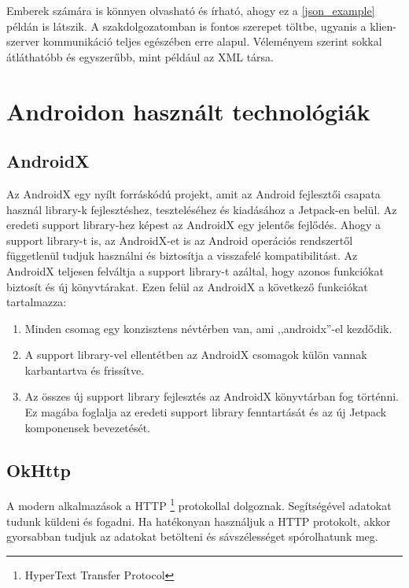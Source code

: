\documentclass{thesis-ekf}
\theoremstyle{definition}
\theoremstyle{remark}
\begin{document}


Emberek számára is könnyen olvasható és írható, ahogy ez a \ref{json_example} példán is látszik. 
A szakdolgozatomban is fontos szerepet töltbe, ugyanis a klien-szerver kommunikáció teljes egészében erre alapul.
Véleményem szerint sokkal átláthatóbb és egyszerűbb, mint például az XML társa.

\section{Androidon használt technológiák}

\subsection{AndroidX}

Az AndroidX egy nyílt forráskódú projekt, amit az Android fejlesztői csapata használ library-k fejlesztéshez, teszteléséhez és kiadásához a Jetpack-en belül.
Az eredeti support library-hez képest az AndroidX egy jelentős fejlődés. Ahogy a support library-t is, az AndroidX-et is az Android operációs rendszertől függetlenül tudjuk használni és biztosítja a visszafelé kompatibilitást.
Az AndroidX teljesen felváltja a support library-t azáltal, hogy azonos funkciókat biztosít és új könyvtárakat.
Ezen felül az AndroidX a következő funkciókat tartalmazza:

\begin{enumerate}
	\item Minden csomag egy konzisztens névtérben van, ami ,,androidx''-el kezdődik.
	\item A support library-vel ellentétben az AndroidX csomagok külön vannak karbantartva és frissítve.
	\item Az összes új support library fejlesztés az AndroidX könyvtárban fog történni. Ez magába foglalja az eredeti support library fenntartását és az új Jetpack komponensek bevezetését.
\end{enumerate}


\subsection{OkHttp}

A modern alkalmazások a HTTP \footnote{HyperText Transfer Protocol} protokollal dolgoznak. 
Segítségével adatokat tudunk küldeni és fogadni.
Ha hatékonyan használjuk a HTTP protokolt, akkor gyorsabban tudjuk az adatokat betölteni és sávszélességet spórolhatunk meg. 
\end{document}
